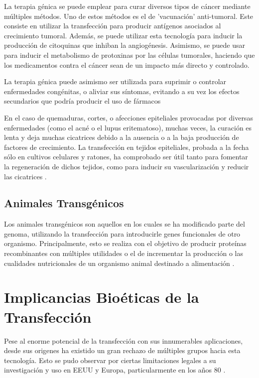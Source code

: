 \documentclass[fleqn,10pt]{SelfArx} %
\begin{document}
La terapia génica se puede emplear para curar diversos tipos de cáncer mediante múltiples métodos. Uno de estos métodos es el de 'vacunación' anti-tumoral. Este consiste en utilizar la transfección para producir antígenos asociados al crecimiento tumoral. Además, se puede utilizar esta tecnología para inducir la producción de citoquinas que inhiban la angiogénesis. Asimismo, se puede usar para inducir el metabolismo de protoxinas por las células tumorales, haciendo que los medicamentos contra el cáncer sean de un impacto más directo y controlado\cite{Vile, Seung}.

La terapia génica puede asimismo ser utilizada para suprimir o controlar enfermedades congénitas, o aliviar sus síntomas, evitando a su vez los efectos secundarios que podría producir el uso de fármacos \cite{Spink}

En el caso de quemaduras, cortes, o afecciones epiteliales provocadas por diversas enfermedades (como el acné o el lupus eritematoso), muchas veces, la curación es lenta y deja muchas cicatrices debido a la ausencia o a la baja producción de factores de crecimiento. La transfección en tejidos epiteliales, probada a la fecha sólo en cultivos celulares y ratones, ha comprobado ser útil tanto para fomentar la regeneración de dichos tejidos, como para inducir su vascularización y reducir las cicatrices \cite{branskigene2006, Reinhart, strulovicihuman2007}.

\subsection{Animales Transgénicos}

Los animales transgénicos son aquellos en los cuales se ha modificado parte del genoma, utilizando la transfección para introducirle genes funcionales de otro organismo. Principalmente, esto se realiza con el objetivo de producir proteínas recombinantes con múltiples utilidades o el de incrementar la producción o las cualidades nutricionales de un organismo animal destinado a alimentación \cite{Koszarycz2004}.



\section{Implicancias Bioéticas de la Transfección}

Pese al enorme potencial de la transfección con sus innumerables aplicaciones, desde sus origenes ha existido un gran rechazo de múltiples grupos hacia esta tecnología. Esto se pudo observar por ciertas limitaciones legales a su investigación y uso en EEUU y Europa, particularmente en los años 80 \cite{Spink} .





\end{document}

